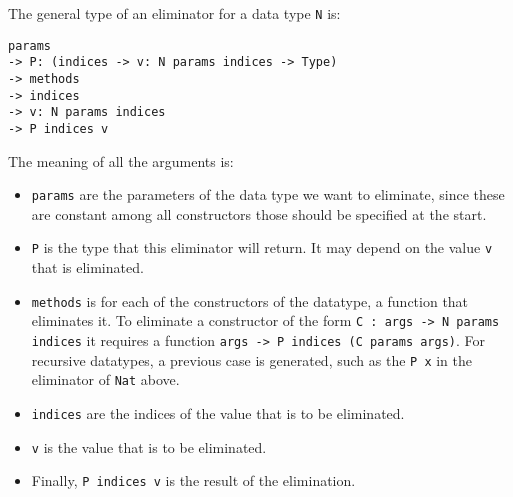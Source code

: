 The general type of an eliminator for a data type \verb|N| is:
\begin{lstlisting}
params 
-> P: (indices -> v: N params indices -> Type) 
-> methods
-> indices
-> v: N params indices
-> P indices v
\end{lstlisting}
The meaning of all the arguments is:
\begin{itemize}
	\item \verb|params| are the parameters of the data type we want to eliminate, since these are constant among all constructors those should be specified at the start.
	\item \verb|P| is the type that this eliminator will return. It may depend on the value \verb|v| that is eliminated.
	\item \verb|methods| is for each of the constructors of the datatype, a function that eliminates it. To eliminate a constructor of the form \verb|C : args -> N params indices| it requires a function \verb|args -> P indices (C params args)|. For recursive datatypes, a previous case is generated, such as the \verb|P x| in the eliminator of \verb|Nat| above.
	\item \verb|indices| are the indices of the value that is to be eliminated.
	\item \verb|v| is the value that is to be eliminated.
	\item Finally, \verb|P indices v| is the result of the elimination.
\end{itemize}

